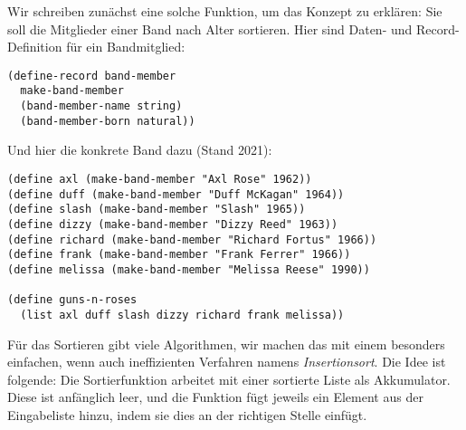Wir schreiben zunächst eine solche Funktion, um das Konzept zu
erklären: Sie soll die Mitglieder einer Band nach Alter sortieren.
Hier sind Daten- und Record-Definition für ein Bandmitglied:
%
\begin{lstlisting}
(define-record band-member
  make-band-member
  (band-member-name string)
  (band-member-born natural))
\end{lstlisting}
%
Und hier die konkrete Band dazu (Stand 2021):
%
\begin{lstlisting}
(define axl (make-band-member "Axl Rose" 1962))
(define duff (make-band-member "Duff McKagan" 1964))
(define slash (make-band-member "Slash" 1965))
(define dizzy (make-band-member "Dizzy Reed" 1963))
(define richard (make-band-member "Richard Fortus" 1966))
(define frank (make-band-member "Frank Ferrer" 1966))
(define melissa (make-band-member "Melissa Reese" 1990))

(define guns-n-roses
  (list axl duff slash dizzy richard frank melissa))
\end{lstlisting}
%
Für das Sortieren gibt viele Algorithmen, wir machen das mit einem
besonders einfachen, wenn auch ineffizienten Verfahren namens
\textit{Insertionsort}.  Die Idee ist folgende:
Die Sortierfunktion arbeitet mit einer sortierte Liste als
Akkumulator.  Diese ist anfänglich leer, und die Funktion fügt jeweils
ein Element aus der Eingabeliste hinzu, indem sie dies an der
richtigen Stelle einfügt.


